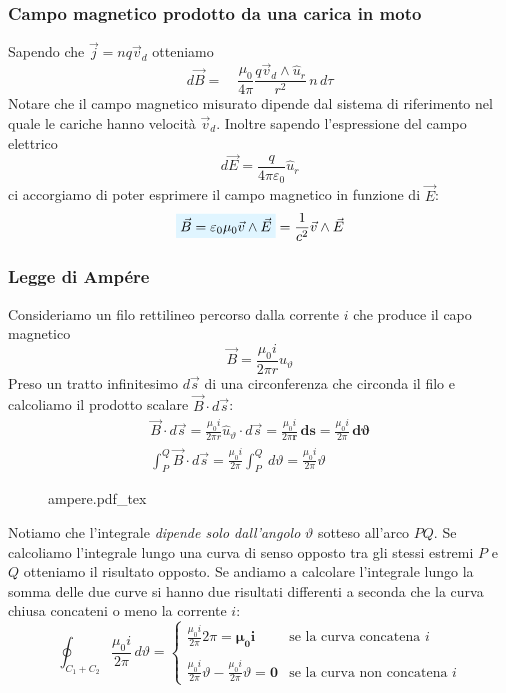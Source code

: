 \documentclass[x11names]{report}
\newcommand{\incfig}[1]{%
	{#1.pdf_tex}
}
\newcommand{\viola}[1]{%
	\colorbox{myblue}{$\displaystyle #1$}
}
\begin{document}
\subsubsection{Campo magnetico prodotto da una carica in moto}
Sapendo che \(\vec{j} = n q \vec{v}_d\) otteniamo
\[
d\vec{B} = \quad \frac{\mu_0}{4\pi} \frac{q\vec{v}_d \wedge \hat{u}_r}{r^2} \, n \, d\tau 
\]
Notare che il campo magnetico misurato dipende dal sistema di riferimento nel quale le cariche hanno velocità \(\vec{v}_d\). Inoltre sapendo l'espressione del campo elettrico
\[
d\vec{E} = \frac{q}{4\pi \varepsilon_0}\hat{u}_r
\]
ci accorgiamo di poter esprimere il campo magnetico in funzione di \(\vec{E}\):
\begin{equation}
	\viola{\vec{B} = \varepsilon_0 \mu_0 \vec{v}\wedge\vec{E}} = \frac{1}{c^2} \vec{v}\wedge\vec{E}
\end{equation}

\subsubsection{Legge di Ampére}

Consideriamo un filo rettilineo percorso dalla corrente \(i\) che produce  il capo magnetico 
\[
\vec{B} = \frac{\mu_0 i}{2\pi r} \hat{u}_\vartheta
\]
Preso un tratto infinitesimo \(d\vec{s}\) di una circonferenza che circonda il filo e calcoliamo il prodotto scalare \(\vec{B}\cdot d\vec{s}\):
\begin{gather*}
	\vec{B}\cdot d\vec{s} = \frac{\mu_0 i}{2\pi r} \hat{u}_\vartheta \cdot d\vec{s} = \frac{\mu_0 i}{2\pi\boldsymbol{ r}} \, \boldsymbol{ds} = \frac{\mu_0 i}{2\pi} \, \boldsymbol{d\vartheta} \\
	\int_P^Q \vec{B}\cdot d\vec{s} =  \frac{\mu_0 i}{2\pi} \int_P^Q \, d\vartheta =  \frac{\mu_0 i}{2\pi} \vartheta
\end{gather*}
\begin{figure}[H]
	\centering
	\incfig{ampere}
\end{figure}
Notiamo che l'integrale \textit{dipende solo dall'angolo} \(\vartheta\) sotteso all'arco \(PQ\). Se calcoliamo l'integrale lungo una curva di senso opposto tra gli stessi estremi \(P\) e \(Q\) otteniamo il risultato opposto. Se andiamo a calcolare l'integrale lungo la somma delle due curve si hanno due risultati differenti a seconda che la curva chiusa concateni o meno la corrente \(i\):
\[
\oint_{C_1 + C_2} \frac{\mu_0 i}{2\pi} \, d\vartheta = 
\left\{\begin{array}{lr}
	\frac{\mu_0 i}{2\pi}2\pi =\boldsymbol{ \mu_0 i} & \text{se la curva concatena } i\\ \\
	\frac{\mu_0 i}{2\pi}\vartheta - \frac{\mu_0 i}{2\pi}\vartheta = \boldsymbol{0} & \text{se la curva non concatena } i
\end{array}\right.
\]
\end{document}
